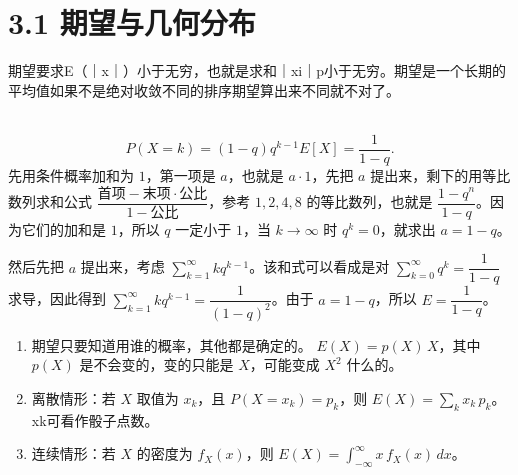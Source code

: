 \section*{3.1 期望与几何分布}
\begin{definition}[期望的存在性]
    期望要求E（｜x｜）小于无穷，也就是求和｜xi｜p小于无穷。期望是一个长期的平均值如果不是绝对收敛不同的排序期望算出来不同就不对了。
\end{definition}
\begin{note}[几何分布]\\
\[
P(X=k)=(1-q)q^{k-1}         
E[X]=\frac{1}{1-q}.
\]
 先用条件概率加和为 $1$，第一项是 $a$，也就是 $a\cdot 1$，先把 $a$ 提出来，剩下的用等比数列求和公式
$\dfrac{\text{首项}-\text{末项}\cdot\text{公比}}{1-\text{公比}}$，参考 $1,2,4,8$ 的等比数列，也就是
$\dfrac{1-q^n}{1-q}$。因为它们的加和是 $1$，所以 $q$ 一定小于 $1$，当 $k\to\infty$ 时 $q^k=0$，就求出
$a=1-q$。

然后先把 $a$ 提出来，考虑 $\sum_{k=1}^{\infty} k q^{k-1}$。该和式可以看成是对
$\sum_{k=0}^{\infty} q^k=\dfrac{1}{1-q}$ 求导，因此得到
$\sum_{k=1}^{\infty} k q^{k-1}=\dfrac{1}{(1-q)^2}$。由于 $a=1-q$，所以
$E=\dfrac{1}{1-q}$。
\end{note}
\begin{enumerate}
  \item 期望只要知道用谁的概率，其他都是确定的。  
  $E(X)=p(X)\,X$，其中 $p(X)$ 是不会变的，变的只能是 $X$，可能变成 $X^2$ 什么的。

 \item  离散情形：若 $X$ 取值为 $x_k$，且 $P(X=x_k)=p_k$，则
  $E(X)=\sum_{k} x_k\,p_k$。
 xk可看作骰子点数。
 \item 连续情形：若 $X$ 的密度为 $f_X(x)$，则
  $E(X)=\int_{-\infty}^{\infty} x\,f_X(x)\,dx$。
\end{enumerate}

